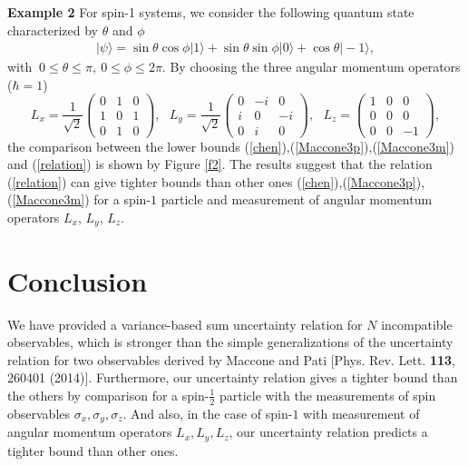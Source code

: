 \documentclass[fleqn,10pt]{wlscirep}
\begin{document}
{\bf Example 2} For spin-1 systems, we consider the following quantum state characterized by $\theta$ and $\phi$
%
\begin{align}
|\psi\rangle=\sin \theta \cos \phi |1\rangle
+\sin \theta  \sin \phi |0\rangle+\cos \theta |-1\rangle,
\end{align}
%
with $~0\leq\theta\leq\pi,~0\leq\phi\leq2\pi$. By choosing the three angular momentum operators ($\hbar=1$)
%
\begin{equation*}
L_{x}=\frac{1}{\sqrt{2}}\begin{pmatrix}
0 & 1 & 0\\1 & 0 & 1\\0 & 1 & 0
\end{pmatrix},~~~
L_{y}=\frac{1}{\sqrt{2}}\begin{pmatrix}
0 & -i & 0\\i & 0 & -i\\0 & i & 0
\end{pmatrix},~~~
L_{z}=\begin{pmatrix}
1 & 0 & 0\\0 & 0 & 0\\0 & 0 & -1
\end{pmatrix},
\end{equation*}
%
the comparison between the lower bounds (\ref{chen}),(\ref{Maccone3p}),(\ref{Maccone3m}) and (\ref{relation})
is shown by Figure \ref{f2}. The results suggest that the relation (\ref{relation})
can give tighter bounds than other ones  (\ref{chen}),(\ref{Maccone3p}),(\ref{Maccone3m})
for a spin-$1$ particle and measurement of angular momentum operators $L_x$, $L_y$, $L_z$.

%
\section*{Conclusion}

We have provided a variance-based sum uncertainty relation for $N$ incompatible observables, which is stronger than the simple generalizations of the uncertainty relation for two observables derived by Maccone and Pati [Phys. Rev. Lett. {\bf113}, 260401 (2014)]. Furthermore, our uncertainty relation gives a tighter bound than the others by comparison for a spin-$\frac{1}{2}$ particle with the measurements of spin observables $\sigma_x,\sigma_y,\sigma_z$. And also, in the case of spin-$1$ with measurement of angular momentum operators $L_x,L_y,L_z$,
our uncertainty relation predicts a tighter bound than other ones.
\end{document}
